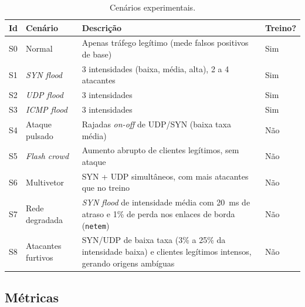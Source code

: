 \documentclass[12pt]{article}
\begin{document}
\begin{table}[ht]
\centering
\caption{Cenários experimentais.}
\label{tab:cenarios}
\footnotesize
\begin{tabularx}{\textwidth}{@{}p{0.9cm}p{3.6cm}Yp{1.6cm}@{}}
\toprule
\textbf{Id} & \textbf{Cenário} & \textbf{Descrição} & \textbf{Treino?} \\
\midrule
S0 & Normal & Apenas tráfego legítimo (mede falsos positivos de base) & Sim \\
S1 & \textit{SYN flood} & 3 intensidades (baixa, média, alta), 2 a 4 atacantes & Sim \\
S2 & \textit{UDP flood} & 3 intensidades & Sim \\
S3 & \textit{ICMP flood} & 3 intensidades & Sim \\
S4 & Ataque pulsado & Rajadas \textit{on-off} de UDP/SYN (baixa taxa média) & Não \\
S5 & \textit{Flash crowd} & Aumento abrupto de clientes legítimos, sem ataque & Não \\
S6 & Multivetor & SYN + UDP simultâneos, com mais atacantes que no treino & Não \\
S7 & Rede degradada & \textit{SYN flood} de intensidade média com 20~ms de atraso e 1\% de perda nos enlaces de borda (\texttt{netem}) & Não \\
S8 & Atacantes furtivos & SYN/UDP de baixa taxa (3\% a 25\% da intensidade baixa) e clientes legítimos intensos, gerando origens ambíguas & Não \\
\bottomrule
\end{tabularx}
\end{table}

\subsection{Métricas}
\end{document}
